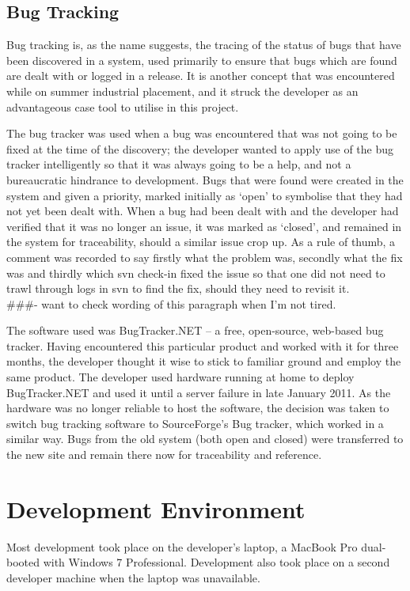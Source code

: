 \documentclass{l4proj}
\newcommand{\revisit}{\#\#\#}
\begin{document}
\subsection{Bug Tracking}
\label{bugTracking}
Bug tracking is, as the name suggests, the tracing of the status of bugs that have been discovered in a system, used primarily to ensure that bugs which are found are dealt with or logged in a release.  It is another concept that was encountered while on summer industrial placement, and it struck the developer as an advantageous \gls{case} tool to utilise in this project.

The bug tracker was used when a bug was encountered that was not going to be fixed at the time of the discovery; the developer wanted to apply use of the bug tracker intelligently so that it was always going to be a help, and not a bureaucratic hindrance to development.  Bugs that were found were created in the system and given a priority, marked initially as `open' to symbolise that they had not yet been dealt with.  When a bug had been dealt with and the developer had verified that it was no longer an issue, it was marked as `closed', and remained in the system for traceability, should a similar issue crop up.  As a rule of thumb, a comment was recorded to say firstly what the problem was, secondly what the fix was and thirdly which \gls{svn} check-in fixed the issue so that one did not need to trawl through logs in \gls{svn} to find the fix, should they need to revisit it.\\ \revisit - want to check wording of this paragraph when I'm not tired.

The software used was BugTracker.NET -- a free, open-source, web-based bug tracker.  Having encountered this particular product and worked with it for three months, the developer thought it wise to stick to familiar ground and employ the same product.  The developer used hardware running at home to deploy BugTracker.NET and used it until a server failure in late January 2011.  As the hardware was no longer reliable to host the software, the decision was taken to switch bug tracking software to SourceForge's Bug tracker, which worked in a similar way.  Bugs from the old system (both open and closed) were transferred to the new site and remain there now for traceability and reference. \\

\section{Development Environment}
Most development took place on the developer's laptop, a MacBook Pro dual-booted with Windows 7 Professional.  Development also took place on a second developer machine when the laptop was unavailable.
\end{document}
